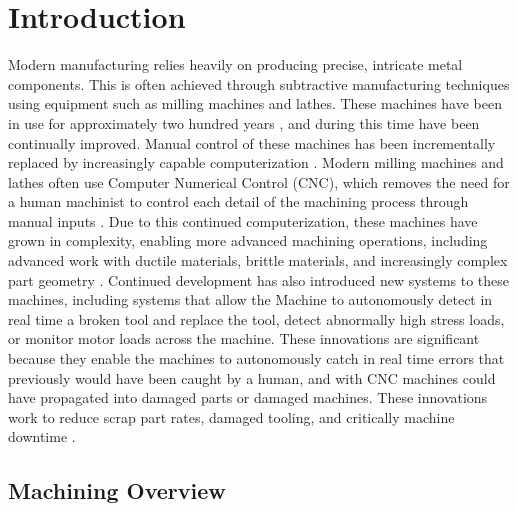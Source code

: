 \chapter{Introduction}\label{CH:introduction}
 Modern manufacturing relies heavily on producing precise, intricate metal components. This is often achieved through subtractive manufacturing techniques using equipment such as milling machines and lathes. These machines have been in use for approximately two hundred years \cite{groover_fundamentals_2010,moriwaki_multi-functional_2008}, and during this time have been continually improved. Manual control of these machines has been incrementally replaced by increasingly capable computerization \cite{reintjes_numerical_1991,groover_fundamentals_2010}. Modern milling machines and lathes often use Computer Numerical Control (CNC), which removes the need for a human machinist to control each detail of the machining process through manual inputs \cite{groover_fundamentals_2010}. Due to this continued computerization, these machines have grown in complexity, enabling more advanced machining operations, including advanced work with ductile materials, brittle materials, and increasingly complex part geometry \cite{moriwaki_multi-functional_2008,sheng_review_2026}. Continued development has also introduced new systems to these machines, including systems that allow the Machine to autonomously detect in real time a broken tool and replace the tool, detect abnormally high stress loads, or monitor motor loads across the machine. These innovations are significant because they enable the machines to autonomously catch in real time errors that previously would have been caught by a human, and with CNC machines could have propagated into damaged parts or damaged machines. These innovations work to reduce scrap part rates, damaged tooling, and critically machine downtime \cite{nagaraj_tool_2025,wong_technical_2020}.


\section{Machining Overview}\label{machiningOverview}
